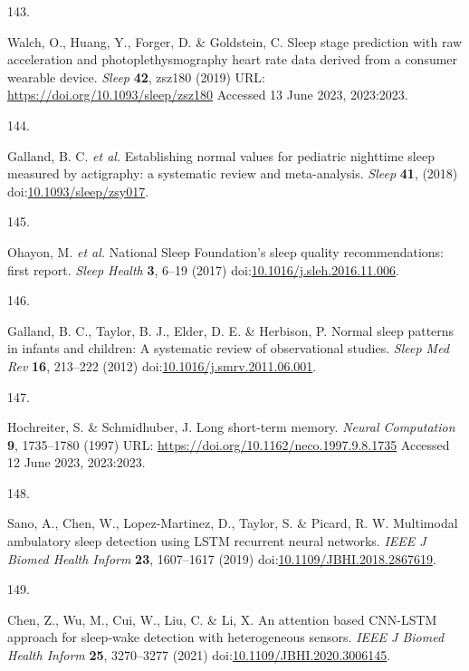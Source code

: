 \documentclass[
  10pt,
]{scrbook}
\newlength{\cslhangindent}
\newlength{\csllabelwidth}
\newlength{\cslentryspacingunit} %
\newenvironment{CSLReferences}[2] %
 {%
  \setlength{\parindent}{0pt}
  \ifodd #1
  \let\oldpar\par
  \def\par{\hangindent=\cslhangindent\oldpar}
  \fi
  \setlength{\parskip}{#2\cslentryspacingunit}
 }%
 {}
\newcommand{\CSLLeftMargin}[1]{\parbox[t]{\csllabelwidth}{#1}}
\newcommand{\CSLRightInline}[1]{\parbox[t]{\linewidth - \csllabelwidth}{#1}\break}
\let\originaltextbf\textbf
\renewcommand{\textbf}[1]{\textcolor{color1}{\originaltextbf{#1}}}
\begin{document}
\begin{CSLReferences}{0}{0}
\leavevmode{}%
\CSLLeftMargin{143. }%
\CSLRightInline{Walch, O., Huang, Y., Forger, D. \& Goldstein, C. Sleep
stage prediction with raw acceleration and photoplethysmography heart
rate data derived from a consumer wearable device. \emph{Sleep}
\textbf{42}, zsz180 (2019) URL:
\url{https://doi.org/10.1093/sleep/zsz180} Accessed 13 June 2023,
2023:2023.}

\leavevmode{}%
\CSLLeftMargin{144. }%
\CSLRightInline{Galland, B. C. \emph{et al.} Establishing normal values
for pediatric nighttime sleep measured by actigraphy: a systematic
review and meta-analysis. \emph{Sleep} \textbf{41}, (2018)
doi:\href{https://doi.org/10.1093/sleep/zsy017}{10.1093/sleep/zsy017}.}

\leavevmode{}%
\CSLLeftMargin{145. }%
\CSLRightInline{Ohayon, M. \emph{et al.} National Sleep Foundation's
sleep quality recommendations: first report. \emph{Sleep Health}
\textbf{3}, 6--19 (2017)
doi:\href{https://doi.org/10.1016/j.sleh.2016.11.006}{10.1016/j.sleh.2016.11.006}.}

\leavevmode{}%
\CSLLeftMargin{146. }%
\CSLRightInline{Galland, B. C., Taylor, B. J., Elder, D. E. \& Herbison,
P. Normal sleep patterns in infants and children: A systematic review of
observational studies. \emph{Sleep Med Rev} \textbf{16}, 213--222 (2012)
doi:\href{https://doi.org/10.1016/j.smrv.2011.06.001}{10.1016/j.smrv.2011.06.001}.}

\leavevmode{}%
\CSLLeftMargin{147. }%
\CSLRightInline{Hochreiter, S. \& Schmidhuber, J. Long short-term
memory. \emph{Neural Computation} \textbf{9}, 1735--1780 (1997) URL:
\url{https://doi.org/10.1162/neco.1997.9.8.1735} Accessed 12 June 2023,
2023:2023.}

\leavevmode{}%
\CSLLeftMargin{148. }%
\CSLRightInline{Sano, A., Chen, W., Lopez-Martinez, D., Taylor, S. \&
Picard, R. W. Multimodal ambulatory sleep detection using {LSTM}
recurrent neural networks. \emph{{IEEE} J Biomed Health Inform}
\textbf{23}, 1607--1617 (2019)
doi:\href{https://doi.org/10.1109/JBHI.2018.2867619}{10.1109/JBHI.2018.2867619}.}

\leavevmode{}%
\CSLLeftMargin{149. }%
\CSLRightInline{Chen, Z., Wu, M., Cui, W., Liu, C. \& Li, X. An
attention based {CNN}-{LSTM} approach for sleep-wake detection with
heterogeneous sensors. \emph{{IEEE} J Biomed Health Inform} \textbf{25},
3270--3277 (2021)
doi:\href{https://doi.org/10.1109/JBHI.2020.3006145}{10.1109/JBHI.2020.3006145}.}


\end{CSLReferences}
\end{document}
